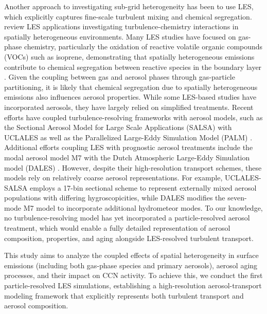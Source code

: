\documentclass[acp]{copernicus}
\begin{document}
Another approach to investigating sub-grid heterogeneity has been to
use LES, which explicitly captures fine-scale turbulent mixing and
chemical segregation.  \citet{brasseur_segregation_2023} review LES
applications investigating turbulence-chemistry interactions in
spatially heterogeneous environments.  Many LES studies have focused
on gas-phase chemistry, particularly the oxidation of reactive
volatile organic compounds (VOCs) such as isoprene, demonstrating that
spatially heterogeneous emissions contribute to chemical segregation
between reactive species in the boundary layer
\citep{ouwersloot_segregation_2011, kaser_chemistry-turbulence_2015}.
Given the coupling between gas and aerosol phases through gas-particle
partitioning, it is likely that chemical segregation due to spatially
heterogeneous emissions also influences aerosol properties. While some
LES-based studies have incorporated aerosols, they have largely relied
on simplified treatments. Recent efforts have coupled
turbulence-resolving frameworks with aerosol models, such as the
Sectional Aerosol Model for Large Scale Applications (SALSA)
\citep{kokkola_salsa_2008} with UCLALES
\citep{tonttila_uclalessalsa_2017} as well as the Parallelized
Large-Eddy Simulation Model (PALM)
\citep{kurppa_implementation_2019}. Additional efforts coupling LES
with prognostic aerosol treatments include the modal aerosol model M7
\citep{vignati_m7_2004} with the Dutch Atmospheric Large-Eddy
Simulation model (DALES) \citep{de_bruine_explicit_2019}. However,
despite their high-resolution transport schemes, these models rely on
relatively coarse aerosol representations. For example, UCLALES-SALSA
employs a 17-bin sectional scheme to represent externally mixed
aerosol populations with differing hygroscopicities, while DALES
modifies the seven-mode M7 model to incorporate additional hydrometeor
modes. To our knowledge, no turbulence-resolving model has yet
incorporated a particle-resolved aerosol treatment, which would enable
a fully detailed representation of aerosol composition, properties,
and aging alongside LES-resolved turbulent transport.

This study aims to analyze the coupled effects of spatial
heterogeneity in surface emissions (including both gas-phase species
and primary aerosols), aerosol aging processes, and their impact on
CCN activity. To achieve this, we conduct the first particle-resolved
LES simulations, establishing a high-resolution aerosol-transport
modeling framework that explicitly represents both turbulent transport
and aerosol composition.
\end{document}
